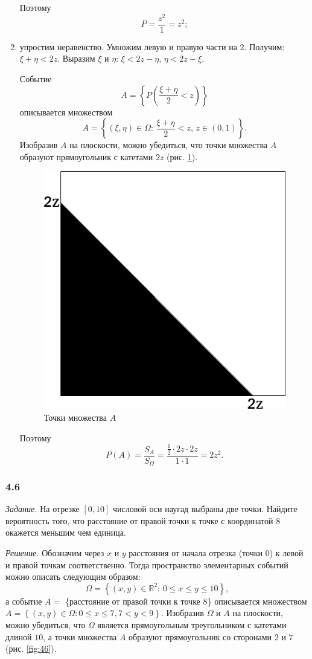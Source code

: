 \begin{enumerate}[label=\alph*)]
Поэтому
$$P =
\frac{z^2}{1} =
z^2;$$

\item упростим неравенство. Умножим левую и правую части на $2$.
Получим: $ \xi + \eta < 2z$.
Выразим $ \xi $ и $ \eta: \, \xi < 2z - \eta, \, \eta < 2z - \xi $.

Событие
$$A =
\left\{ P \left( \frac{ \xi + \eta }{2} < z \right) \right\} $$
описывается множеством
$$A =
\left\{ \left( \xi, \eta \right) \in \Omega: \,
\frac{ \xi + \eta }{2} < z, \,
z \in \left( 0, 1 \right) \right\}.$$
Изобразив $A$ на плоскости, можно убедиться, что точки множества $A$ образуют прямоугольник с катетами $2z$ (рис. \ref{fig:452}).

\begin{figure}[h!]
  \centering
  \includegraphics[width=.4\textwidth]{./pictures/4_5_2.png}
  \caption{Точки множества $A$}
  \label{fig:452}
\end{figure}

Поэтому
$$P \left( A \right) =
\frac{S_A}{S_{ \Omega }} =
\frac{ \frac{1}{2} \cdot 2z \cdot 2z}{1 \cdot 1} =
2z^2.$$
\end{enumerate}

\subsubsection*{4.6}

\textit{Задание.} На отрезке $ \left[ 0, 10 \right] $ числовой оси наугад выбраны две точки.
Найдите вероятность того, что расстояние от правой точки к точке с координатой $8$ окажется меньшим чем единица.

\textit{Решение.} Обозначим через $x$ и $y$ расстояния от начала отрезка (точки $0$) к левой и правой точкам соответственно.
Тогда пространство элементарных событий можно описать следующим образом:
$$ \Omega =
\left\{ \left( x, y \right) \in \mathbb{R}^2: \,
0 \leq x  \leq y \leq 10 \right\},$$
а событие $A =$ \{расстояние от правой точки к точке 8\} описывается множеством $A = \left\{ \left( x, y \right) \in \Omega: 0 \leq x \leq 7, 7 < y < 9 \right\} $.
Изобразив $ \Omega $ и $A$ на плоскости, можно убедиться, что $ \Omega $ является прямоугольным треугольником с катетами длиной $10$,
а точки множества $A$ образуют прямоугольник со сторонами $2$ и $7$ (рис. \ref{fig:46}).

